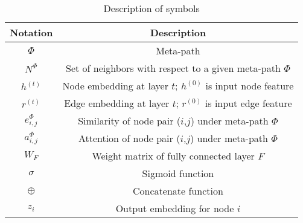 \begin{table}[]
\caption{Description of symbols}
\centering
\begin{tabular}{cc}
\hline
Notation       & Description                                                       \\ \hline
$\Phi$         & Meta-path                                                         \\
$N^\Phi$       & Set of neighbors with respect to a given meta-path $\Phi$          \\
$h^{(t)}$        & Node embedding at layer $t$; $h^{(0)}$ is input node feature \\
$r^{(t)}$        & Edge embedding at layer $t$; $r^{(0)}$ is input edge feature \\
$e_{i,j}^\Phi$ & Similarity of node pair ($i$,$j$) under meta-path $\Phi$   \\
$a_{i,j}^\Phi$ & Attention of node pair ($i$,$j$) under meta-path $\Phi$    \\
$W_F$          & Weight matrix of fully connected layer $F$          \\
$\sigma$       & Sigmoid function                                                  \\
$\oplus$       & Concatenate function \\
$z_i$            & Output embedding for node $i$                                     \\
\hline
\end{tabular}
\label{table:notation}
\end{table}











